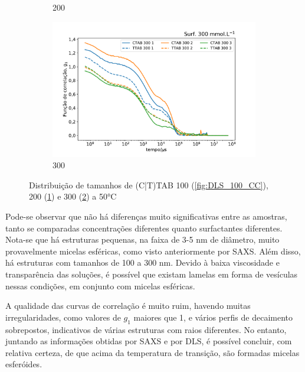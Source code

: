 \begin{figure}[h]
\begin{subfigure}{0.3\textwidth}
		\caption{200\mM}
		\label{fig:DLS_200_CC}
	\end{subfigure} %
	\begin{subfigure}{0.3\textwidth}
		\centering
		\includegraphics[width=\textwidth]{imagens/dls/300_CC}
		\caption{300\mM}
		\label{fig:DLS_300_CC}
	\end{subfigure}
	\caption{Distribuição de tamanhos de (C|T)TAB 100 (\ref{fig:DLS_100_CC}), 200 (\ref{fig:DLS_200_CC}) e 300 (\ref{fig:DLS_300_CC}) \mM{} a 50°C}
	\label{fig:DLS_CC_conc}
\end{figure}

	Pode-se observar que não há diferenças muito significativas entre as amostras, tanto se comparadas concentrações diferentes quanto surfactantes diferentes. Nota-se que há estruturas pequenas, na faixa de 3-5 nm de diâmetro, muito provavelmente micelas esféricas, como visto anteriormente por SAXS. Além disso, há estruturas com tamanhos de 100 a 300 nm. Devido à baixa viscosidade e transparência das soluções, é possível que existam lamelas em forma de vesículas nessas condições, em conjunto com micelas esféricas.
	
	A qualidade das curvas de correlação é muito ruim, havendo muitas irregularidades, como valores de \(g_1\) maiores que 1, e vários perfis de decaimento sobrepostos, indicativos de várias estruturas com raios diferentes. No entanto, juntando as informações obtidas por SAXS e por DLS, é possível concluir, com relativa certeza, de que acima da temperatura de transição, são formadas micelas esferóides. 
	
